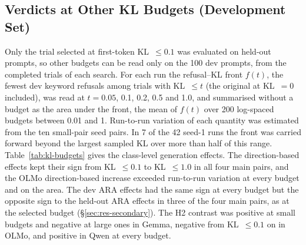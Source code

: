 



\subsection{Verdicts at Other KL Budgets (Development Set)}
\label{app:kl-budgets}

Only the trial selected at first-token KL~$\le 0.1$ was evaluated on held-out
prompts, so other budgets can be read only on the 100 dev prompts, from the
completed trials of each search. For each run the refusal--KL front $f(t)$,
the fewest dev keyword refusals among trials with KL~$\le t$ (the original at
KL~$=0$ included), was read at $t=0.05$, 0.1, 0.2, 0.5 and 1.0, and summarised
without a budget as the area under the front, the mean of $f(t)$ over 200
log-spaced budgets between 0.01 and 1. Run-to-run variation of each quantity
was estimated from the ten small-pair seed pairs. In 7 of the 42 seed-1 runs
the front was carried forward beyond the largest sampled KL over more than
half of this range. Table~\ref{tab:kl-budgets} gives the class-level generation
effects. The direction-based effects kept their sign from KL~$\le 0.1$ to
KL~$\le 1.0$ in all four main pairs, and the OLMo direction-based increase
exceeded run-to-run variation at every budget and on the area. The dev ARA
effects had the same sign at every budget but the opposite sign to the
held-out ARA effects in three of the four main pairs, as at the selected
budget (\S\ref{sec:res-secondary}). The H2 contrast was positive at small
budgets and negative at large ones in Gemma, negative from KL~$\le 0.1$ on in
OLMo, and positive in Qwen at every budget.



